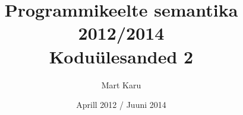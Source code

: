 \documentclass[a4paper,oneside]{article}
\begin{document}
\title{Programmikeelte semantika 2012/2014\\
Koduülesanded 2}
\author{Mart Karu}
\date{Aprill 2012 / Juuni 2014}
\maketitle






\end{document}
